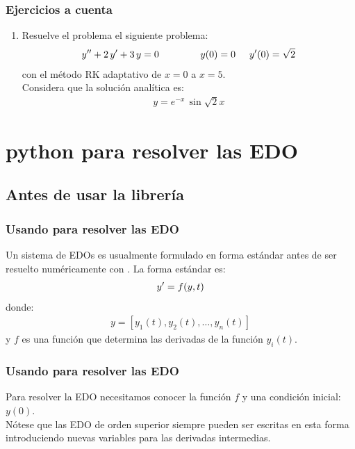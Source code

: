\documentclass[12pt]{beamer}
\begin{document}
\begin{frame}
\frametitle{Ejercicios a cuenta}
\begin{enumerate}
\conti
\item Resuelve el problema el siguiente problema:
\begin{align*}
{y}^{\prime \prime} + 2 \, {y}^{\prime} + 3 \, y = 0 \hspace{1.5cm} y (0) = 0 \hspace{0.5cm} {y}^{\prime} (0) = \sqrt{2}
\end{align*}
con el método RK adaptativo de $x = 0$ a $x = 5$.
\\
Considera que la solución analítica es:
\begin{align*}
y = e^{-x} \, \sin \sqrt{2} x
\end{align*}
\seti
\end{enumerate}
\end{frame}

\section{python para resolver las EDO}
\subsection{Antes de usar la librería}

\begin{frame}
\frametitle{Usando \python{} para resolver las EDO}
Un sistema de EDOs es usualmente formulado en forma estándar antes de ser resuelto numéricamente con \python.
\pause
La forma estándar es:
\begin{align*}
{y}^{\prime} = f (y, t)
\end{align*}
\pause
donde:
\pause
\begin{align*}
y = [y_{1} (t), y_{2} (t), \ldots, y _{n} (t)]
\end{align*}
y $f$ es una función que determina las derivadas de la función $y_{i} (t)$.
\end{frame}
\begin{frame}
\frametitle{Usando \python{} para resolver las EDO}
Para resolver la EDO necesitamos conocer la función $f$ y una condición inicial: $y (0)$.
\\
\medskip
\pause
Nótese que las EDO de orden superior siempre pueden ser escritas en esta forma introduciendo nuevas variables para las derivadas intermedias.
\end{frame}
\end{document}
